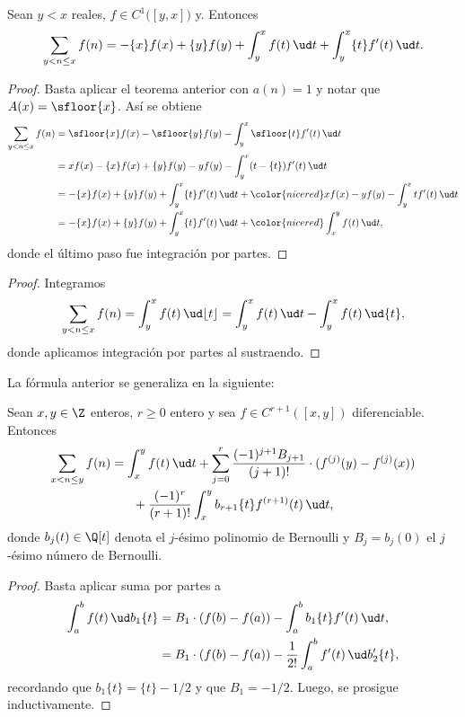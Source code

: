 \documentclass[teoria-numeros.tex]{subfiles}
\begin{document}
\begin{thmi}
	Sean $y < x$ reales, $f \in C^1\big( [y, x] \big)$ y.
	Entonces
	$$ \sum_{y < n\le x} f(n) =  -\{x\}f(x) + \{y\}f(y) + \int_y^x f(t)\, \ud t + \int_y^x \{t\}f'(t)\, \ud t. $$
\end{thmi}
\begin{proof}
	Basta aplicar el teorema anterior con $a(n) = 1$ y notar que $A(x) = \sfloor{x}$.
	Así se obtiene
	\begin{align*}
		\sum_{y < n\le x} f(n) &= \sfloor{x}f(x) - \sfloor{y}f(y) - \int_y^x \sfloor{t}f'(t)\, \ud t \\
		&= xf(x) - \{x\}f(x) + \{y\}f(y) - yf(y) - \int_y^x (t - \{t\})f'(t)\, \ud t \\
		&= - \{x\}f(x) + \{y\}f(y) + \int_y^x \{t\}f'(t)\, \ud t + {\color{nicered} xf(x) - yf(y) - \int_y^x tf'(t)\, \ud t } \\
		&= - \{x\}f(x) + \{y\}f(y) + \int_y^x \{t\}f'(t)\, \ud t + {\color{nicered} \int_x^y f(t) \, \ud t },
	\end{align*}
	donde el último paso fue integración por partes.
\end{proof}
\begin{proof}
	Integramos
	\[
		\sum_{y < n\le x} f(n) = \int_{y}^{x} f(t) \, \ud\lfloor t \rfloor = \int_{y}^{x} f(t) \, \ud t - \int_{y}^{x} f(t) \, \ud\{ t \},
	\]
	donde aplicamos integración por partes al sustraendo.
\end{proof}

La fórmula anterior se generaliza en la siguiente:
\begin{thm}
	Sean $x, y \in \Z$ enteros, $r \ge 0$ entero y sea $f \in C^{r+1}([x, y])$ diferenciable. Entonces
	\begin{multline*}
		\sum_{x < n \le y} f(n) = \int_{x}^{y} f(t) \, \ud t + \sum_{j=0}^{r} \frac{(-1)^{j+1} B_{j+1}}{(j+1)!} \cdot (f^{(j)}(y) - f^{(j)}(x)) \\
		{} + \frac{(-1)^r}{(r + 1)!} \int_{x}^{y} b_{r+1}\{ t \} f^{(r+1)}(t) \, \ud t,
	\end{multline*}
	donde $b_j(t) \in \Q[t]$ denota el $j$-ésimo polinomio de Bernoulli y $B_j = b_j(0)$ el $j$-ésimo número de Bernoulli.
\end{thm}
\begin{proof}
	Basta aplicar suma por partes a
	\begin{align*}
		\int_{a}^{b} f(t) \, \ud b_1\{ t \} &= B_1 \cdot (f(b) - f(a)) - \int_{a}^{b} b_1\{ t \}f'(t) \, \ud t, \\
		                                    &= B_1 \cdot (f(b) - f(a)) - \frac{1}{2!}\int_{a}^{b} f'(t) \, \ud b_2^\prime\{ t \},
	\end{align*}
	recordando que $b_1\{ t \} = \{ t \} - 1/2$ y que $B_1 = -1/2$.
	Luego, se prosigue inductivamente.
\end{proof}
\end{document}
